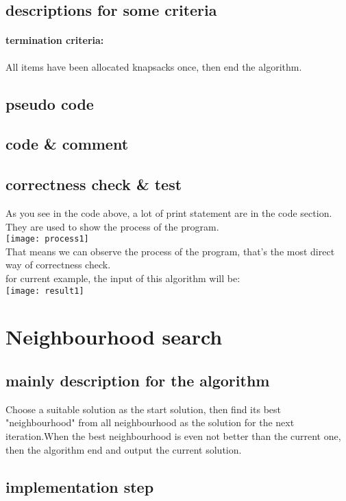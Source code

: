 \documentclass{article}
\begin{document}
\subsection{descriptions for some criteria}
\paragraph{termination criteria:}All items have been allocated knapsacks once, then end the algorithm.
\subsection{pseudo code}

\subsection{code \& comment}

\subsection{correctness check \& test}
As you see in the code above, a lot of print statement are in the code section. They are used to show the process of the program.\\
\texttt{[image: process1]}\\
That means we can observe the process of the program, that's the most direct way of correctness check.\\
for current example, the input of this algorithm will be:\\
\texttt{[image: result1]}\\

\section{Neighbourhood search}
\subsection{mainly description for the algorithm}
Choose a suitable solution as the start solution, then find its best "neighbourhood" from all neighbourhood as the solution for the next iteration.When the best neighbourhood is even not better than the current one, then the algorithm end and output the current solution.
\subsection{implementation step}
\end{document}

